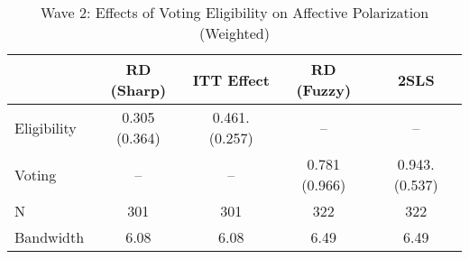 \begin{table}[htbp]
\centering
\caption{Wave 2: Effects of Voting Eligibility on Affective Polarization (Weighted)}
\label{tab:wave2_w}
\begin{tabular}{lcccc}
\hline
 & RD (Sharp) & ITT Effect & RD (Fuzzy) & 2SLS \\
\hline
Eligibility & 0.305 (0.364) & 0.461. (0.257) & -- & -- \\
Voting & -- & -- & 0.781 (0.966) & 0.943. (0.537) \\
\hline
N & 301 & 301 & 322 & 322 \\
Bandwidth & 6.08 & 6.08 & 6.49 & 6.49 \\
\hline
\end{tabular}
\end{table}
